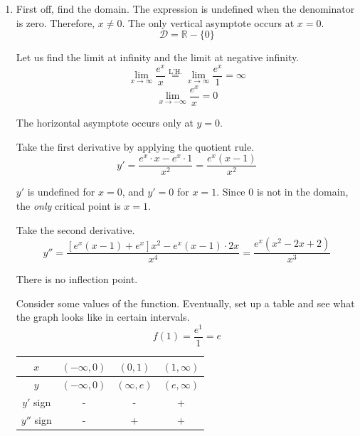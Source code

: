 \documentclass[a4paper, 12pt]{article}
\begin{document}
\begin{enumerate}[leftmargin=*,label=\textbf{\arabic*.}]
Take the derivative of both sides.
\[2D\,\frac{dD}{dt} = 2f(t)f'(t) + 2g(t)g'(t)\]

Solve for $\dfrac{dD}{dt}$.
\[\frac{dD}{dt} = \frac{f(t)f'(t) + g(t)g'(t)}{\displaystyle D}\]

For $t=t_0$, we have $f(t_0)=60,\:g(t_0)=80,f'(t_0)=20,\:g'(t_0)=-25,\:D(t_0)=\sqrt{60^2+80^2}=100$. We may now find the rate of change of the distance at that time.
\[\frac{dD}{dt}\Bigg|_{t=t_0} = \frac{60\cdot 20 -80 \cdot 25}{\displaystyle 100} = \boxed{-8 \, \text{miles/hour}}\]

\item First off, find the domain. The expression is undefined when the denominator is zero. Therefore, $x\neq 0$. The only vertical asymptote occurs at $x = 0$.
\[\mathcal{D} = \mathbb{R} - \{0\}\]

Let us find the limit at infinity and the limit at negative infinity.
\[\lim_{x\to\infty}\frac{ e^x}{x}\overset{\text{L'H.}}{=}\lim_{x\to\infty}\frac{ e^x}{1}=\infty\]
\[\lim_{x\to-\infty}\frac{ e^x}{x}=0\]

The horizontal asymptote occurs only at $y=0$.

Take the first derivative by applying the quotient rule.
\[y'=\frac{ e^x\cdot x- e^x\cdot1}{x^2}=\frac{ e^x(x-1)}{x^2}\]

$y'$ is undefined for $x=0$, and $y'=0$ for $x=1$. Since 0 is not in the domain, the \textit{only} critical point is $x=1$.

Take the second derivative.
\[y''=\frac{[ e^x(x-1)+ e^x]x^2- e^x(x-1)\cdot2x}{x^4}=\frac{ e^x(x^2-2x+2)}{x^3}\]

There is no inflection point.

Consider some values of the function. Eventually, set up a table and see what the graph looks like in certain intervals.
\[f(1) = \frac{ e^1}{1} =  e\]
\begin{center}
    \begin{tabular}{ |c| c c c| } 
    \hline
        $x$ & $(-\infty, 0)$ & $(0, 1)$ & $(1, \infty)$  \\
        \hline
        $y$ & $(-\infty, 0)$ & $(\infty,  e)$ & $( e, \infty)$\\
        \hline
        $y'$ sign & - & - & + \\
        \hline
        $y''$ sign & - & + & + \\
        \hline
    \end{tabular}
\end{center}


\end{enumerate}
\end{document}
